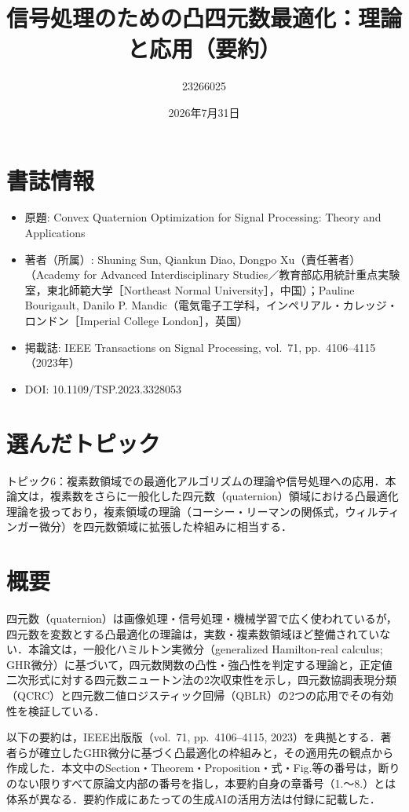 \documentclass[twocolumn, 9pt]{jsarticle}
\title{信号処理のための凸四元数最適化：理論と応用（要約）}
\author{23266025}
\date{2026年7月31日}
\begin{document}
\maketitle

\section*{書誌情報}
\begin{itemize}
    \item 原題: Convex Quaternion Optimization for Signal Processing: Theory and Applications
    \item 著者（所属）: Shuning Sun, Qiankun Diao, Dongpo Xu（責任著者）（Academy for Advanced Interdisciplinary Studies／教育部応用統計重点実験室，東北師範大学［Northeast Normal University］，中国）；Pauline Bourigault, Danilo P. Mandic（電気電子工学科，インペリアル・カレッジ・ロンドン［Imperial College London］，英国）
    \item 掲載誌: IEEE Transactions on Signal Processing, vol.\ 71, pp.\ 4106--4115（2023年）
    \item DOI: 10.1109/TSP.2023.3328053
\end{itemize}

\section*{選んだトピック}

トピック6：複素数領域での最適化アルゴリズムの理論や信号処理への応用．本論文は，複素数をさらに一般化した四元数（quaternion）領域における凸最適化理論を扱っており，複素領域の理論（コーシー・リーマンの関係式，ウィルティンガー微分）を四元数領域に拡張した枠組みに相当する．

\section*{概要}

四元数（quaternion）は画像処理・信号処理・機械学習で広く使われているが，四元数を変数とする凸最適化の理論は，実数・複素数領域ほど整備されていない．本論文は，一般化ハミルトン実微分（generalized Hamilton-real calculus; GHR微分）に基づいて，四元数関数の凸性・強凸性を判定する理論と，正定値二次形式に対する四元数ニュートン法の2次収束性を示し，四元数協調表現分類（QCRC）と四元数二値ロジスティック回帰（QBLR）の2つの応用でその有効性を検証している．

以下の要約は，IEEE出版版（vol.\ 71, pp.\ 4106--4115, 2023）を典拠とする．著者らが確立したGHR微分に基づく凸最適化の枠組みと，その適用先の観点から作成した．本文中のSection・Theorem・Proposition・式・Fig.等の番号は，断りのない限りすべて原論文内部の番号を指し，本要約自身の章番号（1.〜8.）とは体系が異なる．要約作成にあたっての生成AIの活用方法は付録に記載した．
\end{document}
